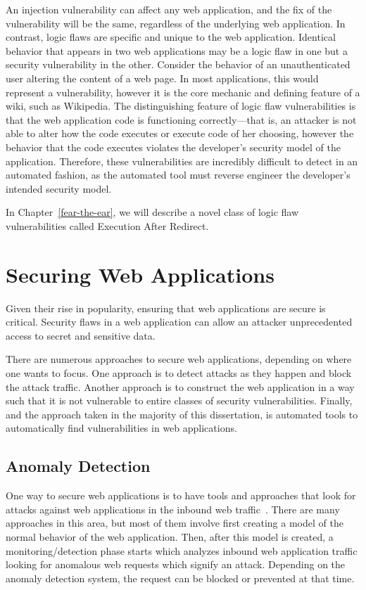 An injection vulnerability can affect any web application, and the fix
of the vulnerability will be the same, regardless of the underlying
web application. In contrast, logic flaws are specific and unique to
the web application. Identical behavior that appears in two web
applications may be a logic flaw in one but a security vulnerability
in the other. Consider the behavior of an unauthenticated user
altering the content of a web page. In most applications, this would
represent a vulnerability, however it is the core mechanic and
defining feature of a wiki, such as Wikipedia. The distinguishing
feature of logic flaw vulnerabilities is that the web application code
is functioning correctly---that is, an attacker is not able to alter
how the code executes or execute code of her choosing, however the
behavior that the code executes violates the developer's security
model of the application. Therefore, these vulnerabilities are
incredibly difficult to detect in an automated fashion, as the
automated tool must reverse engineer the developer's intended security
model.

In Chapter~\ref{fear-the-ear}, we will describe a novel class of logic
flaw vulnerabilities called Execution After Redirect.

\section{Securing Web Applications}

Given their rise in popularity, ensuring that web applications are
secure is critical. Security flaws in a web application can allow an
attacker unprecedented access to secret and sensitive data. 

There are numerous approaches to secure web applications, depending on
where one wants to focus. One approach is to detect attacks as they
happen and block the attack traffic. Another approach is to construct
the web application in a way such that it is not vulnerable to entire
classes of security vulnerabilities. Finally, and the approach taken
in the majority of this dissertation, is automated tools to
automatically find vulnerabilities in web applications.


\subsection{Anomaly Detection}

One way to secure web applications is to have tools and approaches
that look for attacks against web applications in the inbound web
traffic~\cite{robertson09:dissertation}. There are many approaches in
this area, but most of them involve first creating a model of the
normal behavior of the web application. Then, after this model is
created, a monitoring/detection phase starts which analyzes inbound
web application traffic looking for anomalous web requests which signify
an attack. Depending on the anomaly detection system, the request can
be blocked or prevented at that time.

